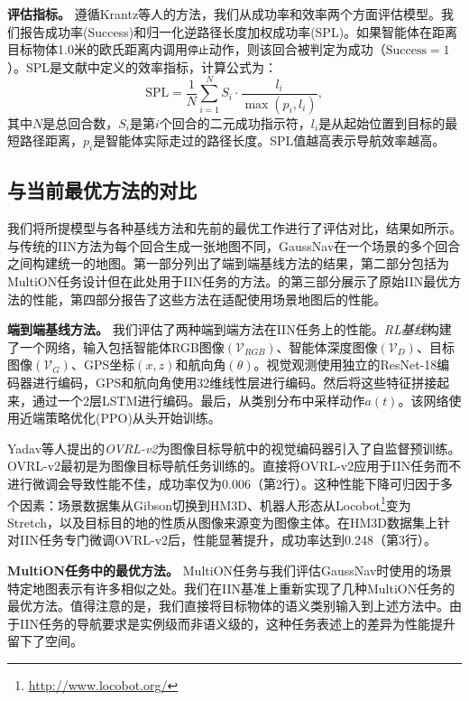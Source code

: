 \textbf{评估指标。} 遵循Krantz等人\cite{krantz2022instancespecific}的方法，我们从成功率和效率两个方面评估模型。我们报告成功率(Success)和归一化逆路径长度加权成功率(SPL)。如果智能体在距离目标物体1.0米的欧氏距离内调用\texttt{停止}动作，则该回合被判定为成功（$\text{Success} = 1$）。SPL是文献\cite{anderson2018evaluation}中定义的效率指标，计算公式为：
\begin{equation}
    \text{SPL} = \frac{1}{N} \sum_{i=1}^{N} S_i \cdot \frac{l_i}{\max(p_i, l_i)},
\end{equation}
其中$N$是总回合数，$S_i$是第$i$个回合的二元成功指示符，$l_i$是从起始位置到目标的最短路径距离，$p_i$是智能体实际走过的路径长度。SPL值越高表示导航效率越高。



\subsection{与当前最优方法的对比}

我们将所提模型与各种基线方法和先前的最优工作进行了评估对比，结果如所示。与传统的IIN方法为每个回合生成一张地图不同，GaussNav在一个场景的多个回合之间构建统一的地图。第一部分列出了端到端基线方法的结果，第二部分包括为MultiON任务设计但在此处用于IIN任务的方法。的第三部分展示了原始IIN最优方法的性能，第四部分报告了这些方法在适配使用场景地图后的性能。

\textbf{端到端基线方法。} 我们评估了两种端到端方法在IIN任务上的性能。\textit{RL基线}构建了一个网络，输入包括智能体RGB图像$(\mathcal{V}_{RGB})$、智能体深度图像$(\mathcal{V}_{D})$、目标图像$(\mathcal{V}_G)$、GPS坐标$(x,z)$和航向角$(\theta)$。视觉观测使用独立的ResNet-18\cite{he2016deep}编码器进行编码，GPS和航向角使用32维线性层进行编码。然后将这些特征拼接起来，通过一个2层LSTM进行编码。最后，从类别分布中采样动作$a(t)$。该网络使用近端策略优化(PPO)\cite{schulman2017proximal}从头开始训练。

Yadav等人\cite{yadav2023ovrl}提出的\textit{OVRL-v2}为图像目标导航中的视觉编码器引入了自监督预训练。OVRL-v2最初是为图像目标导航任务训练的。直接将OVRL-v2应用于IIN任务而不进行微调会导致性能不佳，成功率仅为0.006（第2行）。这种性能下降可归因于多个因素：场景数据集从Gibson\cite{xia2018gibson}切换到HM3D\cite{yadav2023habitat}、机器人形态从Locobot\footnote{\url{http://www.locobot.org/}}变为Stretch，以及目标目的地的性质从图像来源变为图像主体。在HM3D数据集上针对IIN任务专门微调OVRL-v2后，性能显著提升，成功率达到0.248（第3行）。


\textbf{MultiON任务中的最优方法。} MultiON任务与我们评估GaussNav时使用的场景特定地图表示有许多相似之处。我们在IIN基准上重新实现了几种MultiON任务的最优方法\cite{wani2020multion, chen2022learning, marza2023multi}。值得注意的是，我们直接将目标物体的语义类别输入到上述方法中。由于IIN任务的导航要求是实例级而非语义级的，这种任务表述上的差异为性能提升留下了空间。

